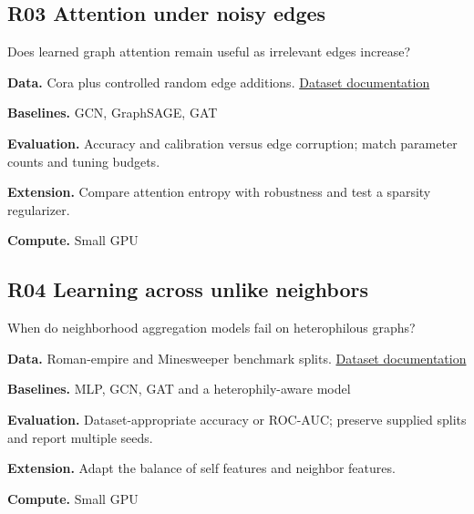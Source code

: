 \documentclass[11pt,letterpaper]{article}
\begin{document}
\begin{minipage}{\linewidth}\subsection*{R03 Attention under noisy edges}
Does learned graph attention remain useful as irrelevant edges increase?\par\textbf{Data.} Cora plus controlled random edge additions. \href{https://pytorch-geometric.readthedocs.io/en/latest/generated/torch_geometric.datasets.Planetoid.html}{Dataset documentation}\par
\textbf{Baselines.} GCN, GraphSAGE, GAT\par
\textbf{Evaluation.} Accuracy and calibration versus edge corruption; match parameter counts and tuning budgets.\par
\textbf{Extension.} Compare attention entropy with robustness and test a sparsity regularizer.\par
\textbf{Compute.} Small GPU\par
\end{minipage}\par\vspace{8pt}
\begin{minipage}{\linewidth}\subsection*{R04 Learning across unlike neighbors}
When do neighborhood aggregation models fail on heterophilous graphs?\par\textbf{Data.} Roman-empire and Minesweeper benchmark splits. \href{https://pytorch-geometric.readthedocs.io/en/latest/generated/torch_geometric.datasets.HeterophilousGraphDataset.html}{Dataset documentation}\par
\textbf{Baselines.} MLP, GCN, GAT and a heterophily-aware model\par
\textbf{Evaluation.} Dataset-appropriate accuracy or ROC-AUC; preserve supplied splits and report multiple seeds.\par
\textbf{Extension.} Adapt the balance of self features and neighbor features.\par
\textbf{Compute.} Small GPU\par
\end{minipage}\par\vspace{8pt}
\end{document}
